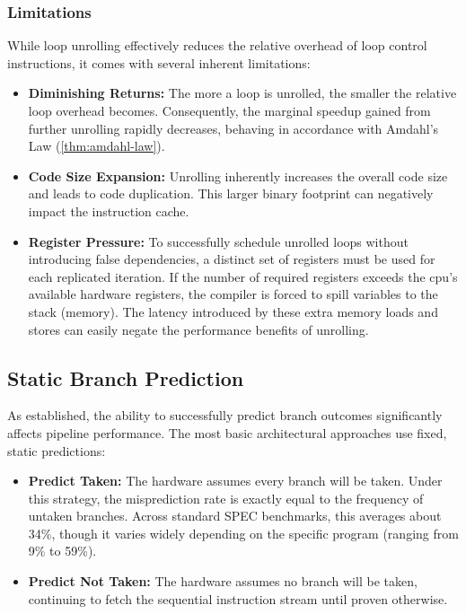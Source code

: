 \subsubsection{Limitations}

While loop unrolling effectively reduces the relative overhead of loop control instructions, it comes with several inherent limitations:
\begin{itemize}
    \item \textbf{Diminishing Returns:} The more a loop is unrolled, the smaller the relative loop overhead becomes. Consequently, the marginal speedup gained from further unrolling rapidly decreases, behaving in accordance with Amdahl's Law (\cref{thm:amdahl-law}).
    \item \textbf{Code Size Expansion:} Unrolling inherently increases the overall code size and leads to code duplication. This larger binary footprint can negatively impact the instruction cache.
    \item \textbf{Register Pressure:} To successfully schedule unrolled loops without introducing false dependencies, a distinct set of registers must be used for each replicated iteration. If the number of required registers exceeds the \gls{cpu}'s available hardware registers, the compiler is forced to spill variables to the stack (memory). The latency introduced by these extra memory loads and stores can easily negate the performance benefits of unrolling.
\end{itemize}

\subsection{Static Branch Prediction}

As established, the ability to successfully predict branch outcomes significantly affects pipeline performance. The most basic architectural approaches use fixed, static predictions:
\begin{itemize}
    \item \textbf{Predict Taken:} The hardware assumes every branch will be taken. Under this strategy, the misprediction rate is exactly equal to the frequency of untaken branches. Across standard SPEC benchmarks, this averages about 34\%, though it varies widely depending on the specific program (ranging from 9\% to 59\%).
    \item \textbf{Predict Not Taken:} The hardware assumes no branch will be taken, continuing to fetch the sequential instruction stream until proven otherwise.
\end{itemize}

